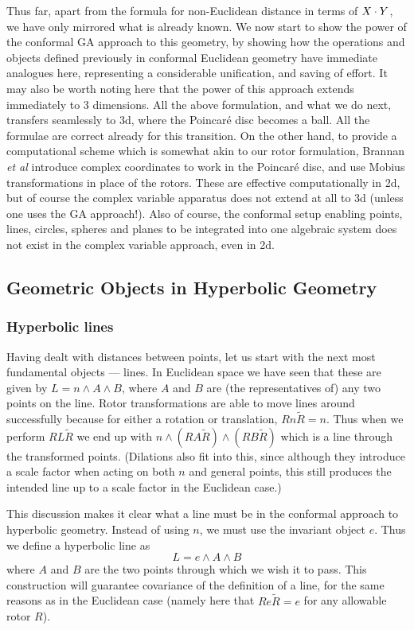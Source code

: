 Thus far, apart from the formula for non-Euclidean
distance in terms of $X \cdot Y$, we have only mirrored
what is already known. We now start to show the power of
the conformal GA approach to this geometry, by showing
how the operations and objects defined previously in
conformal Euclidean geometry have immediate analogues
here, representing a considerable unification, and saving
of effort. It may also be worth noting here that the
power of this approach extends immediately to 3
dimensions. All the above formulation, and what we do
next, transfers seamlessly to 3d, where the Poincar\'e
disc becomes a ball. All the formulae are correct already
for this transition. On the other hand, to provide a
computational scheme which is somewhat akin to our rotor
formulation, Brannan \emph{et al} \cite{GEOM:brannan} introduce complex coordinates
to work in the Poincar\'e disc, and use Mobius
transformations in place of the rotors. These are
effective computationally in 2d, but of course the
complex variable apparatus does not extend at all to 3d
(unless one uses the GA approach!). Also of course, the
conformal setup enabling points, lines, circles, spheres
and planes to be integrated into one algebraic system
does not exist in the complex variable approach, even in
2d.

\subsection{Geometric Objects in Hyperbolic Geometry}

\subsubsection{Hyperbolic lines}

Having dealt with distances between points, let us start with the
next most fundamental objects --- lines. In Euclidean space we
have seen that these are given by $L = n \wedge A \wedge B$, where $A$
and $B$ are (the representatives of) any two points on the line.
Rotor transformations are able to move lines around successfully
because for either a rotation or translation, $R n \tilde{R} = n$.
Thus when we perform $R L \tilde{R}$ we end up with $n \wedge (R A \tilde{R})
\wedge (R B \tilde{R})$ which is a line through the transformed points.
(Dilations also fit into this, since although they introduce a
scale factor when acting on both $n$ and general points, this
still produces the intended line up to a scale factor in the
Euclidean case.)

This discussion makes it clear what a line must be in the
conformal approach to hyperbolic geometry. Instead of
using $n$, we must use the invariant object $e$. Thus we
define a hyperbolic line as
%
\begin{equation}\label{eqn:line-def}
L = e \wedge A \wedge B
\end{equation}
%
where $A$ and $B$ are the two points through which we
wish it to pass. This construction will guarantee
covariance of the definition of a line, for the same
reasons as in the Euclidean case (namely here that $R e
\tilde{R} = e$ for any allowable rotor $R$).

